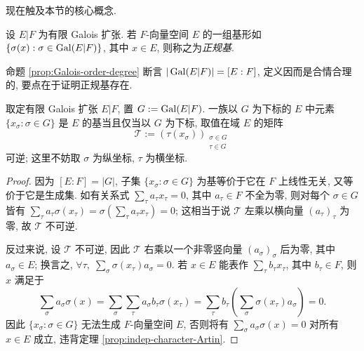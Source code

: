现在触及本节的核心概念.
\begin{definition}
	设 $E|F$ 为有限 Galois 扩张. 若 $F$-向量空间 $E$ 的一组基形如 $\{\sigma(x) : \sigma \in \operatorname{Gal}(E|F) \}$, 其中 $x \in E$, 则称之为\emph{正规基}.
\end{definition}
命题 \ref{prop:Galois-order-degree} 断言 $|\operatorname{Gal}(E|F)| = [E:F]$, 定义因而是合情合理的, 要点在于证明正规基存在.

\begin{lemma}
	取定有限 Galois 扩张 $E|F$, 置 $G := \operatorname{Gal}(E|F)$. 一族以 $G$ 为下标的 $E$ 中元素 $\{x_\sigma : \sigma \in G \}$ 是 $E$ 的基当且仅当以 $G$ 为下标, 取值在域 $E$ 的矩阵
	\[ \mathcal{T} := (\tau(x_\sigma))_{\substack{\sigma \in G \\ \tau \in G}} \]
	可逆; 这里不妨取 $\sigma$ 为纵坐标, $\tau$ 为横坐标.
\end{lemma}
\begin{proof}
	因为 $[E:F]=|G|$, 子集 $\{ x_\sigma : \sigma \in G \}$ 为基等价于它在 $F$ 上线性无关, 又等价于它是生成集. 如有关系式 $\sum_\tau a_\tau x_\tau = 0$, 其中 $a_\tau \in F$ 不全为零, 则对每个 $\sigma \in G$ 皆有 $\sum_\tau a_\tau \sigma(x_\tau) = \sigma\left( \sum_\tau a_\tau x_\tau \right) = 0$; 这相当于说 $\mathcal{T}$ 左乘以横向量 $(a_\tau)_\tau$ 为零, 故 $\mathcal{T}$ 不可逆.
	
	反过来说, 设 $\mathcal{T}$ 不可逆, 因此 $\mathcal{T}$ 右乘以一个非零竖向量 $(a_\sigma)_\sigma$ 后为零, 其中 $a_\sigma \in E$; 换言之, $\forall \tau, \; \sum_\sigma \sigma(x_\tau) a_\sigma = 0$. 若 $x \in E$ 能表作 $\sum_\tau b_\tau x_\tau$, 其中 $b_\tau \in F$, 则 $x$ 满足于
	\[ \sum_\sigma a_\sigma \sigma(x) = \sum_\sigma \sum_\tau a_\sigma b_\tau \sigma(x_\tau) = \sum_\tau b_\tau \left( \sum_\sigma \sigma(x_\tau) a_\sigma \right) = 0. \]
	因此 $\{x_\sigma: \sigma \in G\}$ 无法生成 $F$-向量空间 $E$, 否则将有 $\sum_\sigma a_\sigma \sigma(x) = 0$ 对所有 $x \in E$ 成立, 违背定理 \ref{prop:indep-character-Artin}.
\end{proof}

